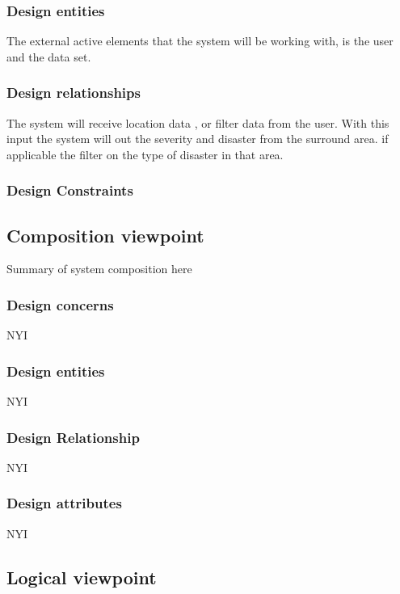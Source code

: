 \documentclass[12pt]{article}
\begin{document}
            \subsubsection{Design entities}
                The external active elements that the system will be working with, is the user and the data set.
            \subsubsection{Design relationships}
                The system will receive location data , or filter data from the user. With this input the system will out the severity and disaster from the surround area. if applicable the filter on the type of disaster in that area.
            \subsubsection{Design  Constraints}
        \subsection{Composition viewpoint}%
            Summary of system composition here
            \subsubsection{Design concerns}
            NYI
            \subsubsection{Design entities}
            NYI
            \subsubsection{Design Relationship}
            NYI
            \subsubsection{Design attributes}
            NYI
        \subsection{Logical viewpoint}%
                 \newpage
\end{document}
